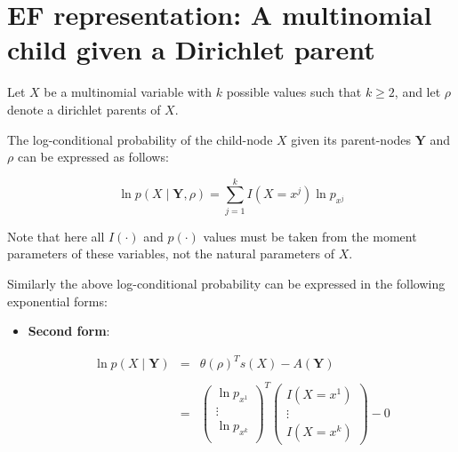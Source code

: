 \documentclass[11pt, oneside]{article}   	%
\numberwithin{figure}{section}
\numberwithin{equation}{section}
\numberwithin{table}{section}
\theoremstyle{definition}
\begin{document}
\begin{appendices}
\begin{itemize}
\end{itemize}

\newpage

\section{EF representation: A multinomial child given a Dirichlet parent}

Let $X$ be a multinomial variable with $k$ possible values such that $k \geq 2$, and let $\rho$ denote a dirichlet parents of $X$. %

The log-conditional probability of the child-node $X$ given its parent-nodes $\mathbf{Y}$ and $\rho$ can be expressed as follows:

$$ \ln p(X \mid \mathbf{Y},\rho) = \sum_{j=1}^k I(X=x^j)  \ln p_{x^j} $$

Note that here all $ I(\cdot)$ and $p(\cdot)$ values must be taken from the moment parameters of these variables, not the natural parameters of $X$.

Similarly the above log-conditional probability can be expressed in the following exponential forms:

\begin{itemize}

\vspace{0.5in}
\item \textbf{Second form}:

\begin{eqnarray*}
\ln p(X \mid \mathbf{Y}) &=& \theta(\rho)^Ts(X) - A(\mathbf{Y}) \\ \\
&=&
\begin{pmatrix}
\ln p_{x^1}\\
\vdots \\
\ln p_{x^k} \\
\end{pmatrix}^T
\begin{pmatrix}
I(X=x^1) \\
\vdots \\
I(X=x^k) 
\end{pmatrix}
- 0 \\ \\
\end{eqnarray*}



\end{itemize}
\end{appendices}
\end{document}
